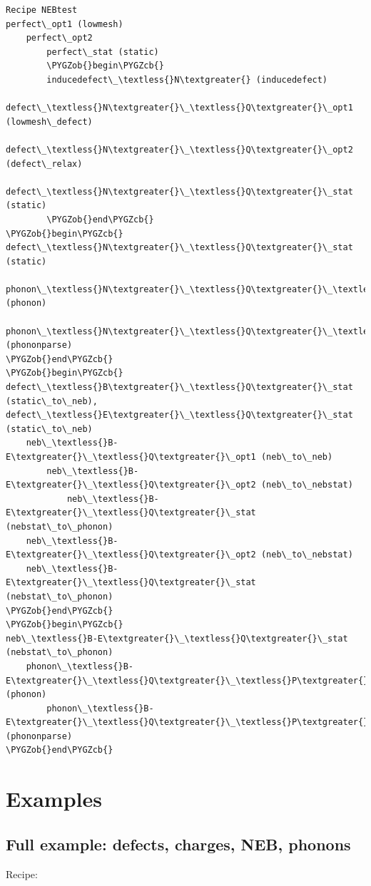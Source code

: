 \documentclass[letterpaper,10pt,english]{sphinxmanual}
\def\PYGZob{\char`\{}
\def\PYGZcb{\char`\}}
\begin{document}
\begin{Verbatim}[commandchars=\\\{\}]
Recipe NEBtest
perfect\_opt1 (lowmesh)
    perfect\_opt2
        perfect\_stat (static)
        \PYGZob{}begin\PYGZcb{}
        inducedefect\_\textless{}N\textgreater{} (inducedefect)
            defect\_\textless{}N\textgreater{}\_\textless{}Q\textgreater{}\_opt1 (lowmesh\_defect)
                defect\_\textless{}N\textgreater{}\_\textless{}Q\textgreater{}\_opt2 (defect\_relax)
                    defect\_\textless{}N\textgreater{}\_\textless{}Q\textgreater{}\_stat (static)
        \PYGZob{}end\PYGZcb{}
\PYGZob{}begin\PYGZcb{}
defect\_\textless{}N\textgreater{}\_\textless{}Q\textgreater{}\_stat (static)
    phonon\_\textless{}N\textgreater{}\_\textless{}Q\textgreater{}\_\textless{}P\textgreater{} (phonon)
        phonon\_\textless{}N\textgreater{}\_\textless{}Q\textgreater{}\_\textless{}P\textgreater{}\_parse (phononparse)
\PYGZob{}end\PYGZcb{}
\PYGZob{}begin\PYGZcb{}
defect\_\textless{}B\textgreater{}\_\textless{}Q\textgreater{}\_stat (static\_to\_neb), defect\_\textless{}E\textgreater{}\_\textless{}Q\textgreater{}\_stat (static\_to\_neb)
    neb\_\textless{}B-E\textgreater{}\_\textless{}Q\textgreater{}\_opt1 (neb\_to\_neb)
        neb\_\textless{}B-E\textgreater{}\_\textless{}Q\textgreater{}\_opt2 (neb\_to\_nebstat)
            neb\_\textless{}B-E\textgreater{}\_\textless{}Q\textgreater{}\_stat (nebstat\_to\_phonon)
    neb\_\textless{}B-E\textgreater{}\_\textless{}Q\textgreater{}\_opt2 (neb\_to\_nebstat)
    neb\_\textless{}B-E\textgreater{}\_\textless{}Q\textgreater{}\_stat (nebstat\_to\_phonon)
\PYGZob{}end\PYGZcb{}
\PYGZob{}begin\PYGZcb{}
neb\_\textless{}B-E\textgreater{}\_\textless{}Q\textgreater{}\_stat (nebstat\_to\_phonon)
    phonon\_\textless{}B-E\textgreater{}\_\textless{}Q\textgreater{}\_\textless{}P\textgreater{} (phonon)
        phonon\_\textless{}B-E\textgreater{}\_\textless{}Q\textgreater{}\_\textless{}P\textgreater{}\_parse (phononparse)
\PYGZob{}end\PYGZcb{}
\end{Verbatim}


\chapter{Examples}
\label{9_0_examples::doc}\label{9_0_examples:examples}

\section{Full example: defects, charges, NEB, phonons}
\label{9_0_examples:full-example-defects-charges-neb-phonons}
Recipe:
\end{document}
